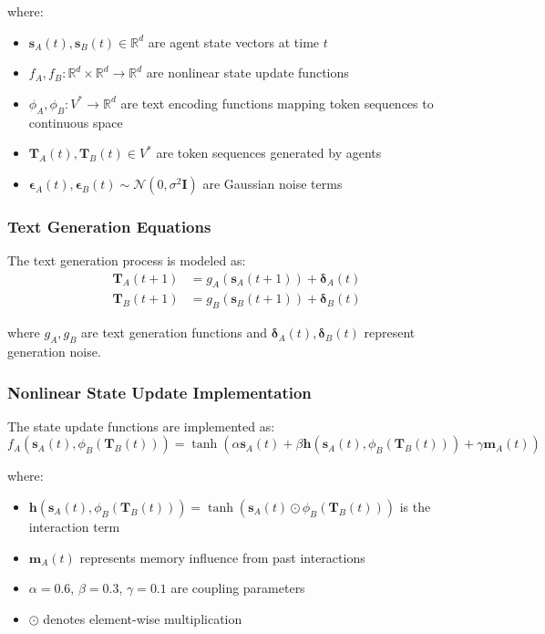 \documentclass[11pt,a4paper]{article}
\begin{document}
where:
\begin{itemize}
    \item $\mathbf{s}_A(t), \mathbf{s}_B(t) \in \mathbb{R}^d$ are agent state vectors at time $t$
    \item $f_A, f_B: \mathbb{R}^d \times \mathbb{R}^d \rightarrow \mathbb{R}^d$ are nonlinear state update functions
    \item $\phi_A, \phi_B: V^* \rightarrow \mathbb{R}^d$ are text encoding functions mapping token sequences to continuous space
    \item $\mathbf{T}_A(t), \mathbf{T}_B(t) \in V^*$ are token sequences generated by agents
    \item $\boldsymbol{\epsilon}_A(t), \boldsymbol{\epsilon}_B(t) \sim \mathcal{N}(0, \sigma^2 \mathbf{I})$ are Gaussian noise terms
\end{itemize}

\subsubsection{Text Generation Equations}

The text generation process is modeled as:
\begin{align}
\mathbf{T}_A(t+1) &= g_A(\mathbf{s}_A(t+1)) + \boldsymbol{\delta}_A(t) \\
\mathbf{T}_B(t+1) &= g_B(\mathbf{s}_B(t+1)) + \boldsymbol{\delta}_B(t)
\end{align}

where $g_A, g_B$ are text generation functions and $\boldsymbol{\delta}_A(t), \boldsymbol{\delta}_B(t)$ represent generation noise.

\subsubsection{Nonlinear State Update Implementation}

The state update functions are implemented as:
\begin{equation}
f_A(\mathbf{s}_A(t), \phi_B(\mathbf{T}_B(t))) = \tanh\left(\alpha \mathbf{s}_A(t) + \beta \mathbf{h}(\mathbf{s}_A(t), \phi_B(\mathbf{T}_B(t))) + \gamma \mathbf{m}_A(t)\right)
\end{equation}

where:
\begin{itemize}
    \item $\mathbf{h}(\mathbf{s}_A(t), \phi_B(\mathbf{T}_B(t))) = \tanh(\mathbf{s}_A(t) \odot \phi_B(\mathbf{T}_B(t)))$ is the interaction term
    \item $\mathbf{m}_A(t)$ represents memory influence from past interactions
    \item $\alpha = 0.6$, $\beta = 0.3$, $\gamma = 0.1$ are coupling parameters
    \item $\odot$ denotes element-wise multiplication
\end{itemize}
\end{document}
